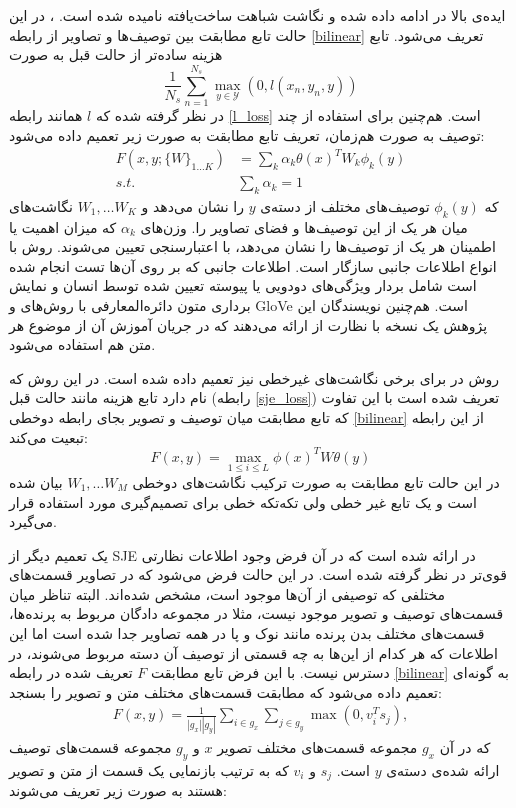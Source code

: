 ایده‌ی بالا در \cite{Akata2015} ادامه داده شده و نگاشت شباهت ساخت‌یافته
نامیده شده است.
، در این حالت تابع مطابقت بین توصیف‌ها و تصاویر از رابطه  \eqref{bilinear} تعریف می‌شود. تابع هزینه ساده‌تر از حالت قبل به صورت
\begin{equation} \label{sje_loss}
\frac{1}{N_s} \sum_{n=1}^{N_s} \max_{y \in \mathcal{Y}}(0, l(x_n, y_n, y))
\end{equation}
در نظر گرفته شده که $l$ همانند رابطه \eqref{l_loss} است. هم‌چنین برای استفاده از چند توصیف به صورت هم‌زمان، تعریف تابع مطابقت به صورت زیر تعمیم داده می‌شود:
\begin{align}
F(x,y;\{W\}_{1\ldots K}) &= \sum_k \alpha_k \theta(x)^T W_k \phi_k(y)  \\
s.t. & \sum_k \alpha_k = 1 \nonumber
\end{align}
که $\phi_k(y)$ توصیف‌های مختلف از دسته‌ی $y$ را نشان می‌دهد و $W_1, \ldots W_K$ نگاشت‌های میان هر یک از این توصیف‌ها و فضای تصاویر را. وزن‌های $\alpha_k$ که میزان اهمیت یا اطمینان  هر یک از توصیف‌ها را نشان می‌دهد، با اعتبارسنجی تعیین می‌شوند. روش  با انواع اطلاعات جانبی سازگار است. اطلاعات جانبی که بر روی آن‌ها تست انجام شده است شامل بردار ویژگی‌های دودویی یا پیوسته تعیین شده توسط انسان و نمایش برداری متون دائره‌المعارفی با روش‌های  \cite{word2vec} و GloVe
\cite{pennington2014glove}
است. هم‌چنین نویسندگان این پژوهش یک نسخه با نظارت از  ارائه می‌دهند که در جریان آموزش آن از موضوع هر متن هم استفاده می‌شود.

 روش  در \cite{Xian2016} برای برخی نگاشت‌های غیرخطی نیز تعمیم داده شده است. در این روش  که
 نام دارد تابع هزینه مانند حالت قبل (رابطه \eqref{sje_loss}) تعریف شده است با این تفاوت که تابع مطابقت میان توصیف و تصویر بجای رابطه دوخطی \eqref{bilinear} از این رابطه تبعیت می‌کند:
 \begin{equation} \label{latem}
 F(x,y) = \max_{1\leq i \leq L} \phi(x)^TW \theta(y)
 \end{equation}
در این حالت تابع مطابقت به صورت ترکیب نگاشت‌های دوخطی $W_1, \ldots W_M$ بیان شده است و یک تابع غیر خطی ولی تکه‌تکه خطی برای تصمیم‌گیری مورد استفاده قرار می‌گیرد.

یک تعمیم دیگر از SJE در \cite{multicue} ارائه شده است که در آن فرض وجود اطلاعات نظارتی قوی‌تر در نظر گرفته شده است.  در این حالت فرض می‌شود که در تصاویر قسمت‌های مختلفی که توصیفی از آن‌ها موجود است، مشخص شده‌اند. البته تناظر میان قسمت‌های توصیف و تصویر موجود نیست، مثلا در مجموعه دادگان مربوط به پرنده‌ها، قسمت‌های مختلف بدن پرنده مانند نوک و پا در همه تصاویر جدا شده است اما این اطلاعات که هر کدام از این‌ها به چه قسمتی از توصیف آن دسته مربوط می‌شوند، در دسترس نیست. با این فرض تابع مطابقت $F$ تعریف شده در رابطه \eqref{bilinear} به گونه‌ای تعمیم داده می‌شود که مطابقت قسمت‌های مختلف متن و تصویر را بسنجد:
\begin{align}
F(x,y) = \frac{1}{|g_x||g_y|} \sum_{i\in g_x}\sum_{j\in g_y} \max(0,v_i^Ts_j),
\end{align}
که در آن 
 $g_x$ 
 مجموعه قسمت‌های مختلف تصویر $x$ و  $g_y$ مجموعه قسمت‌های توصیف ارائه شده‌ی دسته‌ی $y$ است. $s_j$ و $v_i$ که به ترتیب بازنمایی یک قسمت از متن و تصویر هستند به صورت زیر تعریف می‌شوند:
 
